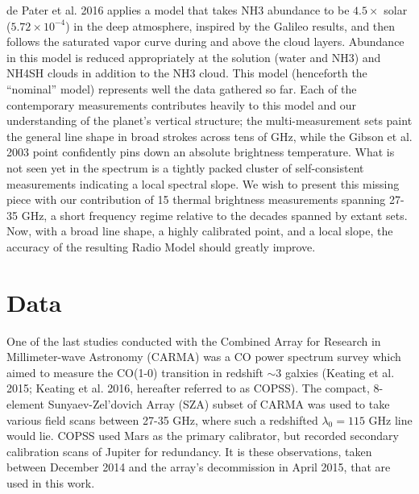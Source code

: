 \documentclass{article}
\newcommand{\e}[1]{\times 10^{#1}}
\begin{document}
	de Pater et al. 2016 applies a model that takes NH3 abundance to be $4.5 \times$ solar ($5.72 \e{-4}$) in the deep atmosphere, inspired by the Galileo results, and then follows the saturated vapor curve during and above the cloud layers.
	Abundance in this model is reduced appropriately at the solution (water and NH3) and NH4SH clouds in addition to the NH3 cloud. This model (henceforth the ``nominal'' model) represents well the data gathered so far.
	Each of the contemporary measurements contributes heavily to this model and our understanding of the planet's vertical structure; the multi-measurement sets paint the general line shape in broad strokes across tens of GHz, while the Gibson et al. 2003 point confidently pins down an absolute brightness temperature.
	What is not seen yet in the spectrum is a tightly packed cluster of self-consistent measurements indicating a local spectral slope.
	We wish to present this missing piece with our contribution of 15 thermal brightness measurements spanning 27-35 GHz, a short frequency regime relative to the decades spanned by extant sets.
	Now, with a broad line shape, a highly calibrated point, and a local slope, the accuracy of the resulting Radio Model should greatly improve.

\section{Data}

	One of the last studies conducted with the Combined Array for Research in Millimeter-wave Astronomy (CARMA) was a CO power spectrum survey which aimed to measure the CO(1-0) transition in redshift $\sim 3$ galxies (Keating et al. 2015; Keating et al. 2016, hereafter referred to as COPSS).
	The compact, 8-element Sunyaev-Zel'dovich Array (SZA) subset of CARMA was used to take various field scans between 27-35 GHz, where such a redshifted $\lambda_{0} = 115$ GHz line would lie.
	COPSS used Mars as the primary calibrator, but recorded secondary calibration scans of Jupiter for redundancy.
	It is these observations, taken between December 2014 and the array's decommission in April 2015, that are used in this work.
\end{document}
